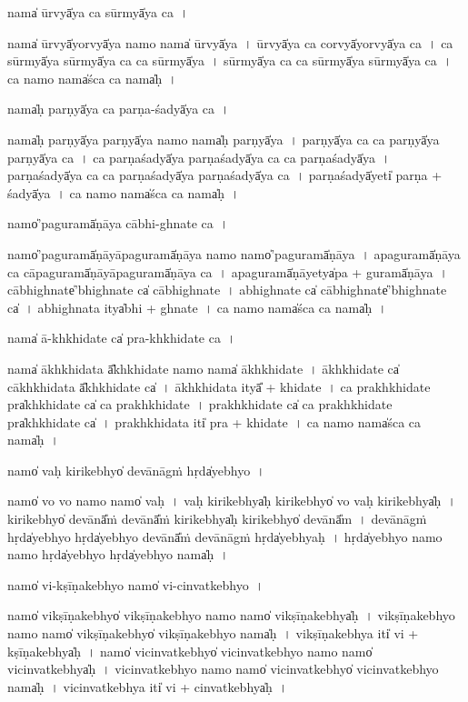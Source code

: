\documentclass[parskip, DIV=14]{scrartcl}
\begin{document}
{nama̍ ū॒rvyā̍ya ca sū॒rmyā̍ya ca~।

nama̍ ū॒rvyā̍yo॒rvyā̍ya॒ namo॒ nama̍ ū॒rvyā̍ya~।
ū॒rvyā̍ya ca co॒rvyā̍yo॒rvyā̍ya ca~।
ca॒ sū॒rmyā̍ya sū॒rmyā̍ya ca ca sū॒rmyā̍ya~।
sū॒rmyā̍ya ca ca sū॒rmyā̍ya sū॒rmyā̍ya ca~।
ca॒ namo॒ nama̍śca ca॒ nama̍ḥ~।

nama̍ḥ pa॒rṇyā̍ya ca parṇa-śa॒dyā̍ya ca॒~।

nama̍ḥ pa॒rṇyā̍ya pa॒rṇyā̍ya॒ namo॒ nama̍ḥ pa॒rṇyā̍ya~।
pa॒rṇyā̍ya ca ca pa॒rṇyā̍ya pa॒rṇyā̍ya ca~।
ca॒ pa॒rṇa॒śa॒dyā̍ya parṇaśa॒dyā̍ya ca ca parṇaśa॒dyā̍ya~।
pa॒rṇa॒śa॒dyā̍ya ca ca parṇaśa॒dyā̍ya parṇaśa॒dyā̍ya ca~।
pa॒rṇa॒śa॒dyā̍yeti̍ parṇa + śa॒dyā̍ya~।
ca॒ namo॒ nama̍śca ca॒ nama̍ḥ~।

namo̍'pagu॒ramā̍ṇāya cābhi-ghna॒te ca॒~।

namo̍'pagu॒ramā̍ṇāyāpagu॒ramā̍ṇāya॒ namo॒ namo̍'pagu॒ramā̍ṇāya~।
a॒pa॒gu॒ramā̍ṇāya ca cāpagu॒ramā̍ṇāyāpagu॒ramā̍ṇāya ca~।
a॒pa॒gu॒ramā̍ṇā॒yetya̍pa + gu॒ramā̍ṇāya~।
cā॒bhi॒ghna॒te̍'bhighna॒te ca̍ cābhighna॒te~।
a॒bhi॒ghna॒te ca̍ cābhighna॒te̍'bhighna॒te ca̍~।
a॒bhi॒ghna॒ta itya̍bhi + ghna॒te~।
ca॒ namo॒ nama̍śca ca॒ nama̍ḥ~।

nama̍ ā-khkhida॒te ca̍ pra-khkhida॒te ca~।

nama̍ ākhkhida॒ta ā̎khkhida॒te namo॒ nama̍ ākhkhida॒te~।
ā॒khkhi॒da॒te ca̍ cākhkhida॒ta ā̎khkhida॒te ca̍~।
ā॒khkhi॒da॒ta ityā̎ + khi॒da॒te~।
ca॒ pra॒khkhi॒da॒te pra̍khkhida॒te ca̍  ca prakhkhida॒te~।
pra॒khkhi॒da॒te ca̍ ca prakhkhida॒te pra̍khkhida॒te ca̍~।
pra॒khkhi॒da॒ta iti̍ pra + khi॒da॒te~।
ca॒ namo॒ nama̍śca ca॒ nama̍ḥ~।

namo̍ vaḥ kiri॒kebhyo̍ de॒vānā॒gṁ॒ hṛda̍yebhyo॒~।

namo̍ vo vo॒ namo॒ namo̍ vaḥ~।
va॒ḥ ki॒ri॒kebhya̍ḥ kiri॒kebhyo̍ vo vaḥ kiri॒kebhya̍ḥ~।
ki॒ri॒kebhyo̍ de॒vānā̎ṁ de॒vānā̎ṁ kiri॒kebhya̍ḥ kiri॒kebhyo̍ de॒vānā̎m~।
de॒vānā॒gṁ॒ hṛda̍yebhyo॒ hṛda̍yebhyo de॒vānā̎ṁ de॒vānā॒gṁ॒ hṛda̍yebhyaḥ~।
hṛda̍yebhyo॒ namo॒ namo॒ hṛda̍yebhyo॒ hṛda̍yebhyo॒ nama̍ḥ~।

namo̍ vi-kṣīṇa॒kebhyo namo̍ vi-cinva॒tkebhyo॒~।

namo̍ vikṣīṇa॒kebhyo̍ vikṣīṇa॒kebhyo॒ namo॒ namo̍ vikṣīṇa॒kebhya̍ḥ~।
vi॒kṣī॒ṇa॒kebhyo namo॒ namo̍ vikṣīṇa॒kebhyo̍ vikṣīṇa॒kebhyo॒ nama̍ḥ~।
vi॒kṣī॒ṇa॒kebhya॒ iti̍ vi + kṣī॒ṇa॒kebhya̍ḥ~।
namo̍ vicinva॒tkebhyo̍ vicinva॒tkebhyo॒ namo॒ namo̍ vicinva॒tkebhya̍ḥ~।
vi॒ci॒nva॒tkebhyo॒ namo॒ namo̍ vicinva॒tkebhyo̍ vicinva॒tkebhyo॒ nama̍ḥ~।
vi॒ci॒nva॒tkebhya॒ iti̍ vi + ci॒nva॒tkebhya̍ḥ~।

}
\end{document}
